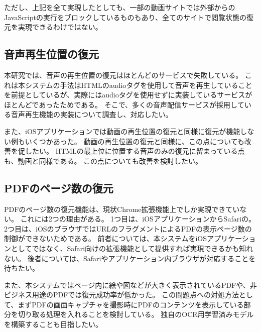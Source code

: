 ただし、上記を全て実現したとしても、一部の動画サイトでは外部からのJavaScriptの実行をブロックしているものもあり、全てのサイトで閲覧状態の復元を実現できるわけではない。

\subsection{音声再生位置の復元}
本研究では、音声の再生位置の復元はほとんどのサービスで失敗している。
これは本システムの手法はHTMLのaudioタグを使用して音声を再生していることを前提としているが、実際にはaudioタグを使用せずに実装しているサービスがほとんどであったためである。
そこで、多くの音声配信サービスが採用している音声再生機能の実装について調査し、対応したい。

また、iOSアプリケーションでは動画の再生位置の復元と同様に復元が機能しない例もいくつかあった。
動画の再生位置の復元と同様に、この点についても改善を促したい。
HTMLの最上位に位置する音声のみの復元に留まっている点も、動画と同様である。
この点についても改善を検討したい。

\subsection{PDFのページ数の復元}
PDFのページ数の復元機能は、現状Chrome拡張機能上でしか実現できていない。
これには2つの理由がある。
1つ目は、iOSアプリケーションからSafariの。
2つ目は、iOSのブラウザではURLのフラグメントによるPDFの表示ページ数の制御ができないためである。
前者については、本システムをiOSアプリケーションとしてではなく、Safari向けの拡張機能として提供すれば実現できるかも知れない。
後者については、Safariやアプリケーション内ブラウザが対応することを待ちたい。

また、本システムではページ内に絵や図などが大きく表示されているPDFや、非ビジネス用途のPDFでは復元成功率が低かった。
この問題点への対処方法として、まずPDFの画面キャプチャを撮影時にPDFのコンテンツを表示している部分を切り取る処理を入れることを検討している。
独自のOCR用学習済みモデルを構築することも目指したい。